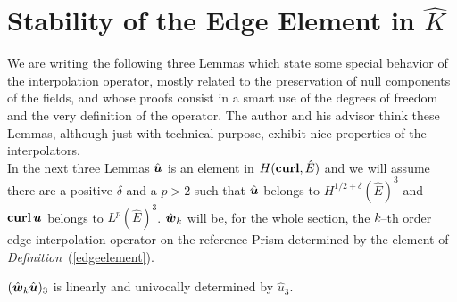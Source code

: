 \section{Stability of the Edge Element in $\hat{K}$}
\label{stab_edge_prism}
We are writing the following three Lemmas which state some special
behavior of the interpolation operator, mostly related to the preservation of
null components of the fields, and whose proofs consist in a smart use of the
degrees of freedom and the very definition of the operator. The author and his
advisor think these Lemmas, although just with technical purpose, exhibit
nice properties of the interpolators.\\
\noindent In the next three Lemmas $\hat{\boldsymbol{u}}$ is an element
in $H({\bf curl},\hat{E})$ and we will assume there are 
a positive $\delta$ and a $p>2$ such that 
$\hat{\boldsymbol{u}}$ belongs to $H^{1/2+\delta}(\hat{E})^3$ and
${\bf curl}\,\boldsymbol{u}$ belongs to $L^p(\hat{E})^3$.
$\hat{\boldsymbol{w}}_k$ will be, for the whole section, the $k$--th order edge 
interpolation operator on the reference
Prism determined by the element of
\emph{Definition}~(\ref{edgeelement}).
\begin{lemma}\label{lema_PIu3_k_cualquiera} 
$(\hat{\boldsymbol{w}}_k\hat{\boldsymbol{u}})_3$ is linearly and univocally 
determined by $\hat{u}_3$.
\end{lemma}
